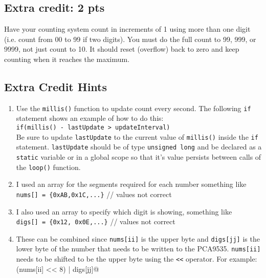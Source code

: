 \subsection{Extra credit: 2 pts}
Have your counting system count in increments of 1 using more than one digit (i.e. 
count from 00 to 99 if two digits). You must do the full count to 99, 999, or 9999,
not just count to 10. It should reset (overflow) back to zero and keep counting 
when it reaches the maximum. 
\subsection{Extra Credit Hints}
\begin{enumerate}
    \item Use the \lstinline|millis()| function to update count every second. The 
            following \lstinline|if| statement shows an example of how to do this: \\
            \lstinline|if(millis() - lastUpdate > updateInterval)| \\
            Be sure to update 
            \lstinline|lastUpdate| to the current value of \lstinline|millis()| inside
            the \lstinline|if| statement. \lstinline|lastUpdate| should be of type 
            \lstinline|unsigned long| and be declared as a \lstinline|static| variable 
            or in a global scope so that it's value persists between calls of the 
            \lstinline|loop()| function.
    \item I used an array for the segments required for each number something like \\
            \lstinline|nums[] = {0xAB,0x1C,...}|  // values not correct
    \item I also used an array to specify which digit is showing, something like \\
            \lstinline|digs[] = {0x12, 0x0E,...}| // values not correct
    \item These can be combined since \lstinline|nums[ii]| is the upper byte and 
            \lstinline|digs[jj]| is the lower byte of the number that needs to be 
            written to the PCA9535. \lstinline|nums[ii]| needs to be shifted to be 
            the upper byte using the \lstinline|<<| operator. For example: \\
            \lstinline@(nums[ii] << 8) | digs[jj]@ 
\end{enumerate}

